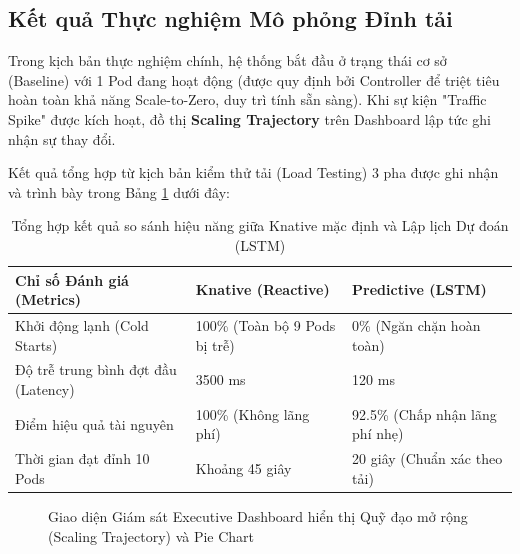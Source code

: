 \subsection{Kết quả Thực nghiệm Mô phỏng Đỉnh tải}
Trong kịch bản thực nghiệm chính, hệ thống bắt đầu ở trạng thái cơ sở (Baseline) với 1 Pod đang hoạt động (được quy định bởi Controller để triệt tiêu hoàn toàn khả năng Scale-to-Zero, duy trì tính sẵn sàng). Khi sự kiện "Traffic Spike" được kích hoạt, đồ thị \textbf{Scaling Trajectory} trên Dashboard lập tức ghi nhận sự thay đổi.

Kết quả tổng hợp từ kịch bản kiểm thử tải (Load Testing) 3 pha được ghi nhận và trình bày trong Bảng \ref{tab:experimental_results} dưới đây:

\begin{table}[h!]
    \centering
    \caption{Tổng hợp kết quả so sánh hiệu năng giữa Knative mặc định và Lập lịch Dự đoán (LSTM)}
    \label{tab:experimental_results}
    \begin{tabular}{|p{4.5cm}|p{5cm}|p{5cm}|}
        \hline
        \textbf{Chỉ số Đánh giá (Metrics)} & \textbf{Knative (Reactive)} & \textbf{Predictive (LSTM)} \\
        \hline
        Khởi động lạnh (Cold Starts) & 100\% (Toàn bộ 9 Pods bị trễ) & 0\% (Ngăn chặn hoàn toàn) \\
        \hline
        Độ trễ trung bình đợt đầu (Latency) & 3500 ms & 120 ms \\
        \hline
        Điểm hiệu quả tài nguyên & 100\% (Không lãng phí) & 92.5\% (Chấp nhận lãng phí nhẹ) \\
        \hline
        Thời gian đạt đỉnh 10 Pods & Khoảng 45 giây & 20 giây (Chuẩn xác theo tải) \\
        \hline
    \end{tabular}
\end{table}

\begin{figure}[h!]
    \centering
    \caption{Giao diện Giám sát Executive Dashboard hiển thị Quỹ đạo mở rộng (Scaling Trajectory) và Pie Chart}
    \label{fig:dashboard}
\end{figure}


